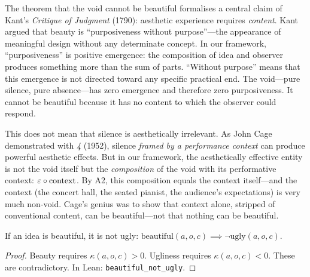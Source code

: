 \begin{interpretation}
\label{interp:kant-purposiveness}
The theorem that the void cannot be beautiful formalises a central claim of Kant's \textit{Critique of Judgment} (1790): aesthetic experience requires \emph{content}.  Kant argued that beauty is ``purposiveness without purpose''---the appearance of meaningful design without any determinate concept.  In our framework, ``purposiveness'' is positive emergence: the composition of idea and observer produces something more than the sum of parts.  ``Without purpose'' means that this emergence is not directed toward any specific practical end.  The void---pure silence, pure absence---has zero emergence and therefore zero purposiveness.  It cannot be beautiful because it has no content to which the observer could respond.

This does not mean that silence is aesthetically irrelevant.  As John Cage demonstrated with \textit{4\textquotesingle\textquotesingle} (1952), silence \emph{framed by a performance context} can produce powerful aesthetic effects.  But in our framework, the aesthetically effective entity is not the void itself but the \emph{composition} of the void with its performative context: $\varepsilon \circ \mathrm{context}$.  By A2, this composition equals the context itself---and the context (the concert hall, the seated pianist, the audience's expectations) is very much non-void.  Cage's genius was to show that context alone, stripped of conventional content, can be beautiful---not that nothing can be beautiful.
\end{interpretation}

\begin{theorem}
\label{thm:beauty-not-ugly}
If an idea is beautiful, it is not ugly: $\mathrm{beautiful}(a, o, c) \implies \neg\mathrm{ugly}(a, o, c)$.
\end{theorem}

\begin{proof}
Beauty requires $\kappa(a, o, c) > 0$.  Ugliness requires $\kappa(a, o, c) < 0$.  These are contradictory.  In Lean: \texttt{beautiful\_not\_ugly}.
\end{proof}

